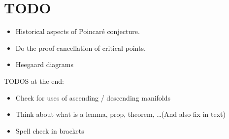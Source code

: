\chapter*{TODO}
\begin{itemize}
    \item Historical aspects of Poincaré conjecture.
    \item Do the proof cancellation of critical points.
    \item Heegaard diagrams
\end{itemize}


TODOS at the end:
\begin{itemize}
    \item Check for uses of ascending / descending manifolds
    \item Think about what is a lemma, prop, theorem, \ldots (And also fix in text)
    \item Spell check in brackets
\end{itemize}
